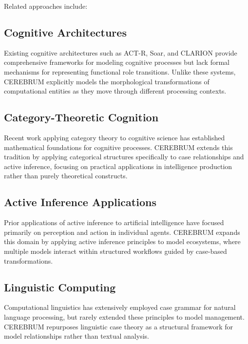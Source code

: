 Related approaches include:

\hypertarget{cognitive-architectures}{%
\subsection{Cognitive Architectures}\label{cognitive-architectures}}

Existing cognitive architectures such as ACT-R, Soar, and CLARION
provide comprehensive frameworks for modeling cognitive processes but
lack formal mechanisms for representing functional role transitions.
Unlike these systems, CEREBRUM explicitly models the morphological
transformations of computational entities as they move through different
processing contexts.

\hypertarget{category-theoretic-cognition}{%
\subsection{Category-Theoretic
Cognition}\label{category-theoretic-cognition}}

Recent work applying category theory to cognitive science has
established mathematical foundations for cognitive processes. CEREBRUM
extends this tradition by applying categorical structures specifically
to case relationships and active inference, focusing on practical
applications in intelligence production rather than purely theoretical
constructs.

\hypertarget{active-inference-applications}{%
\subsection{Active Inference
Applications}\label{active-inference-applications}}

Prior applications of active inference to artificial intelligence have
focused primarily on perception and action in individual agents.
CEREBRUM expands this domain by applying active inference principles to
model ecosystems, where multiple models interact within structured
workflows guided by case-based transformations.

\hypertarget{linguistic-computing}{%
\subsection{Linguistic Computing}\label{linguistic-computing}}

Computational linguistics has extensively employed case grammar for
natural language processing, but rarely extended these principles to
model management. CEREBRUM repurposes linguistic case theory as a
structural framework for model relationships rather than textual
analysis.

